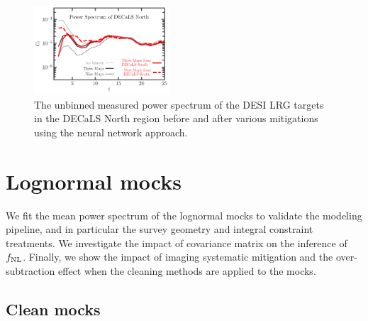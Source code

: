 \begin{figure}
    \centering
    \includegraphics[width=0.45\textwidth]{figures/cl_SonN.pdf}
    \caption{The unbinned measured power spectrum of the DESI LRG targets in the DECaLS North region before and after various mitigations using the neural network approach.}
    \label{fig:clSonN}
\end{figure}


\section{Lognormal mocks}
We fit the mean power spectrum of the lognormal mocks to validate the modeling pipeline, and in particular the survey geometry and integral constraint treatments. We investigate the impact of covariance matrix on the inference of $f_{\rm NL}$. Finally, we show the impact of imaging systematic mitigation and the over-subtraction effect when the cleaning methods are applied to the mocks. 

\subsection{Clean mocks}

